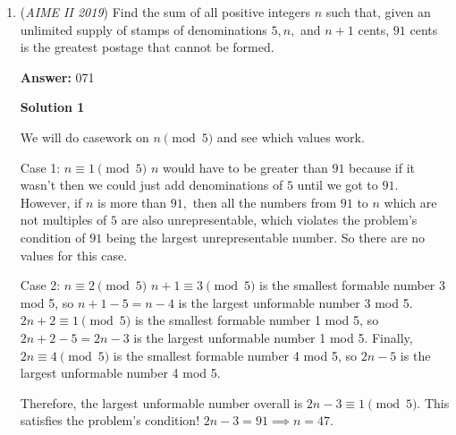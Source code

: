 \begin{enumerate}
 which yields the solution 
 \[X = -\frac{1}{56}-\frac{1+\sqrt{2}}{72},\quad Y=-\frac{1+\sqrt{2}}{56}+\frac{1}{72}.\]Then by the Shoelace formula, the area bounded by $PA_6,PA_7$ and arc $A_6A_7$ is\begin{align*}[A_6A_7P]+S &= \frac{r^2+rx(1-\sqrt{2})+ry}{8} + \frac{1}{8} - \frac{r^2}{\sqrt{8}}\\&= \frac{1}{8} + \frac{1-\sqrt{2}}{\sqrt{8}}\left(-\frac{1}{56}-\frac{1+\sqrt{2}}{72}\right)  + \frac{1}{\sqrt{8}}\left(-\frac{1+\sqrt{2}}{56}+\frac{1}{72}\right)\\&= \frac{1}{8} +\frac{1}{72\sqrt{2}} - \frac{1}{56\sqrt{2}}\\&= \frac{1}{8} - \frac{\sqrt{2}}{504}.\end{align*}
The requested integer is $n=\boxed{504}.$~TThB0501

 


	\item (\textit{AIME II 2019}) Find the sum of all positive integers $n$ such that, given an unlimited supply of stamps of denominations $5,n,$ and $n+1$ cents, $91$ cents is the greatest postage that cannot be formed.


 
 \textbf{Answer: }071



\textbf{Solution 1}

We will do casework on $n \pmod{5}$ and see which values work. 

 Case 1: $n \equiv 1 \pmod{5}$
$n$ would have to be greater than $91$ because if it wasn't then we could just add denominations of $5$ until we got to $91.$ However, if $n$ is more than $91,$ then all the numbers from $91$ to $n$ which are not multiples of $5$ are also unrepresentable, which violates the problem's condition of $91$ being the largest unrepresentable number. So there are no values for this case. 

 
Case 2: $n \equiv 2 \pmod{5}$
$n + 1 \equiv 3 \pmod{5}$ is the smallest formable number 3 mod 5, so $n + 1 - 5 = n - 4$ is the largest unformable number 3 mod 5. $2n + 2 \equiv 1 \pmod{5}$ is the smallest formable number 1 mod 5, so $2n + 2 - 5 = 2n - 3$ is the largest unformable number 1 mod 5. Finally, $2n \equiv 4 \pmod{5}$ is the smallest formable number 4 mod 5, so $2n - 5$ is the largest unformable number 4 mod 5.

 Therefore, the largest unformable number overall is $2n - 3 \equiv 1 \pmod{5}.$ This satisfies the problem's condition!  $2n - 3 = 91 \implies n = 47.$ 


\end{enumerate}
